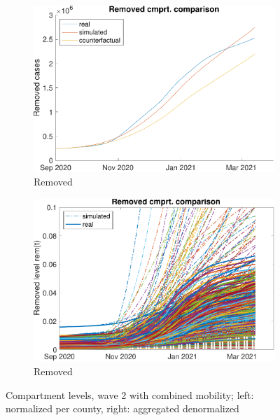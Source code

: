 \begin{figure}[hbtp]
     \begin{subfigure}[b]{.45\linewidth}
         \centering
         \includegraphics[width=\linewidth]{img/210907_223108_combined_wave2/figures/COMP_rem}
         \caption{Removed}
         \label{fig:compAggrCombWave2Rem}
     \end{subfigure}
     \hfill
     \begin{subfigure}[b]{.45\linewidth}
         \centering
         \includegraphics[width=\linewidth]{img/210907_223108_combined_wave2/figures/SEIR_r_sim-vs-real}
         \caption{Removed}
         \label{fig:compCombWave2Rem}
     \end{subfigure}     
     \caption{Compartment levels, wave 2 with combined mobility; left: normalized per county, right: aggregated denormalized}
     \label{fig:compCombWave2}
\end{figure}

